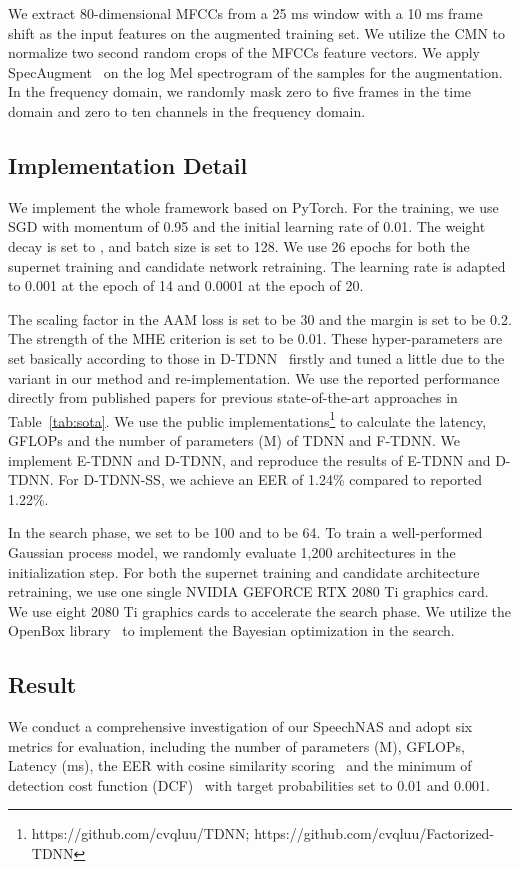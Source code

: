 \documentclass{article}
\begin{document}
We extract 80-dimensional MFCCs from a 25 ms window with a 10 ms frame shift as the input features on the augmented training set. We utilize the CMN to normalize two second random crops of the MFCCs feature vectors. We apply SpecAugment~\cite{park2019specaugment} on the log Mel spectrogram of the samples for the augmentation. In the frequency domain, we randomly mask zero to five frames in the time domain and zero to ten channels in the frequency domain.

\subsection{Implementation Detail}\label{sec:exper_impl}
We implement the whole framework based on PyTorch. For the training, we use SGD with momentum of 0.95 and the initial learning rate of 0.01. The weight decay is set to , and batch size is set to 128. We use 26 epochs for both the supernet training and candidate network retraining. The learning rate is adapted to 0.001 at the epoch of 14 and 0.0001 at the epoch of 20.  

The scaling factor  in the AAM loss is set to be 30 and the margin  is set to be 0.2. The strength of the MHE criterion  is set to be 0.01. These hyper-parameters are set basically according to those in D-TDNN~\cite{yu2020densely} firstly and tuned a little due to the variant in our method and re-implementation. We use the reported performance directly from published papers for previous state-of-the-art approaches in Table~\ref{tab:sota}. We use the public implementations\footnote{https://github.com/cvqluu/TDNN; https://github.com/cvqluu/Factorized-TDNN} to calculate the latency, GFLOPs and the number of parameters (M) of TDNN and F-TDNN. We implement E-TDNN and D-TDNN, and reproduce the results of E-TDNN and D-TDNN. For D-TDNN-SS, we achieve an EER of 1.24\% compared to reported 1.22\%.

In the search phase, we set  to be 100 and  to be 64. To train a well-performed Gaussian process model, we randomly evaluate 1,200 architectures in the initialization step. For both the supernet training and candidate architecture retraining, we use one single NVIDIA GEFORCE RTX 2080 Ti graphics card. We use eight 2080 Ti graphics cards to accelerate the search phase. We utilize the OpenBox library~\cite{li2021openbox} to implement the Bayesian optimization in the search. 

\subsection{Result}\label{sec:exper_result}
We conduct a comprehensive investigation of our SpeechNAS and adopt six metrics for evaluation, including the number of parameters (M), GFLOPs, Latency (ms), the EER with cosine similarity scoring~\cite{snyder2019speaker} and the minimum of detection cost function (DCF)~\cite{snyder2019speaker} with target probabilities set to 0.01 and 0.001. 
\end{document}
